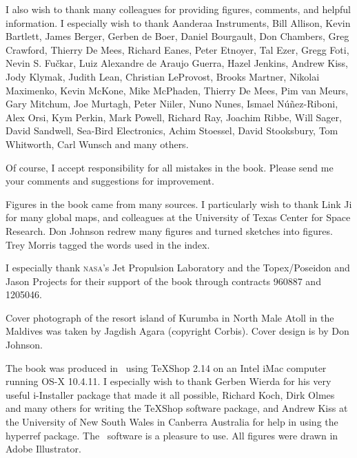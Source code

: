 I also wish to thank many colleagues for providing figures, comments, and helpful information. I especially wish to thank Aanderaa Instruments, Bill Allison, Kevin Bartlett, James Berger, Gerben de Boer, Daniel Bourgault,  Don Chambers, Greg Crawford, Thierry De Mees, Richard Eanes, Peter Etnoyer, Tal Ezer, Gregg Foti, Nevin S. Fu\v{c}kar, Luiz Alexandre de Araujo Guerra, Hazel Jenkins, Andrew Kiss, Jody Klymak, Judith Lean, Christian LeProvost, Brooks Martner, Nikolai Maximenko, Kevin McKone, Mike McPhaden, Thierry De Mees, Pim van Meurs, Gary Mitchum, Joe Murtagh, Peter Niiler, Nuno Nunes, Ismael N\'{u}\~{n}ez-Riboni, Alex Orsi, Kym Perkin, Mark Powell, Richard Ray, Joachim Ribbe, Will Sager, David Sandwell, Sea-Bird Electronics, Achim Stoessel, David Stooksbury, Tom Whitworth, Carl Wunsch and many others.

Of course, I accept responsibility for all mistakes in the book. Please send me your comments and suggestions for improvement.

Figures in the book came from many sources. I particularly wish to thank Link Ji for many global maps, and colleagues at the University of Texas Center for Space Research. Don Johnson redrew many figures and turned sketches into figures. Trey Morris tagged the words used in the index.

I especially thank \textsc{nasa}'s Jet Propulsion Laboratory and the Topex/Poseidon and Jason Projects for their support of the book through contracts 960887 and 1205046.

Cover photograph of the resort island of Kurumba in North Male Atoll in the Maldives was taken by Jagdish Agara (copyright Corbis). Cover design is by Don Johnson.

The book was produced in \LaTeXe\ using TeXShop 2.14 on an Intel iMac computer running OS-X 10.4.11. I especially wish to thank Gerben Wierda for his very useful i-Installer package that made it all possible, Richard Koch, Dirk Olmes and many others for writing the TeXShop software package, and Andrew Kiss at the University of New South Wales in Canberra Australia for help in using the hyperref package. The \LaTeXe\  software is a pleasure to use. All figures were drawn in Adobe Illustrator.

